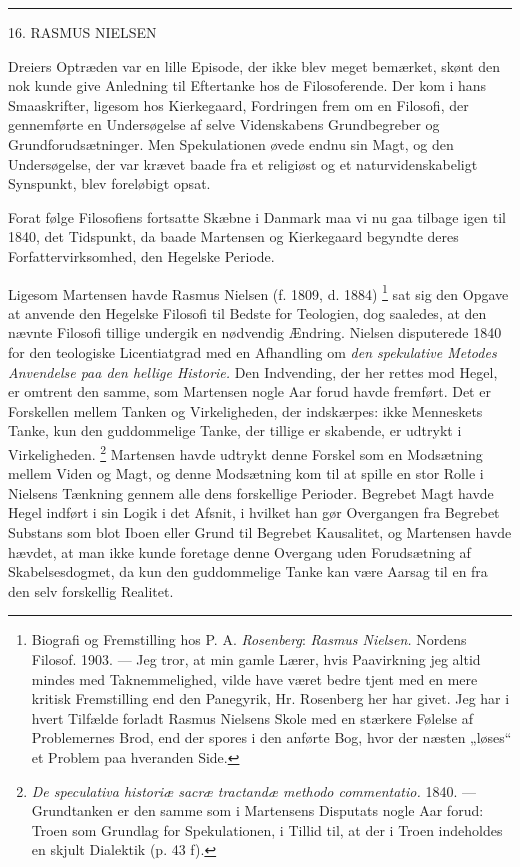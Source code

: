 \documentclass[12pt,a4paper,openany]{book}
\newcommand{\opage}[1]{\marginnote{\footnotesize\textit{[#1]}}}
\begin{document}
\begin{center}\rule{2cm}{0.4pt}\end{center}

\setcounter{footnote}{0}%
\opage{184}

\begin{center}\large 16. RASMUS NIELSEN\end{center}

Dreiers Optræden var en lille Episode, der ikke blev meget bemærket, skønt den
nok kunde give Anledning til Eftertanke hos de Filosoferende. Der kom i hans
Smaaskrifter, ligesom hos Kierkegaard, Fordringen frem om en Filosofi, der
gennemførte en Undersøgelse af selve Videnskabens Grundbegreber og
Grundforudsætninger. Men Spekulationen øvede endnu sin Magt, og den
Undersøgelse, der var krævet baade fra et religiøst og et naturvidenskabeligt
Synspunkt, blev foreløbigt opsat.

Forat følge Filosofiens fortsatte Skæbne i Danmark maa vi nu gaa tilbage igen
til 1840, det Tidspunkt, da baade Martensen og Kierkegaard begyndte deres
Forfattervirksomhed, den Hegelske Periode.

Ligesom Martensen havde Rasmus Nielsen (f. 1809, d. 1884)%
\footnote[1]{Biografi og Fremstilling hos P. A. \emph{Rosenberg}:
\textit{Rasmus Nielsen.} Nordens Filosof. 1903. --- Jeg tror, at min gamle
Lærer, hvis Paavirkning jeg altid mindes med Taknemmelighed, vilde have været
bedre tjent med en mere kritisk Fremstilling end den Panegyrik, Hr. Rosenberg
her har givet. Jeg har i hvert Tilfælde forladt Rasmus Nielsens Skole med en
stærkere Følelse af Problemernes Brod, end der spores i den anførte Bog, hvor
der næsten „løses“ et Problem paa hveranden Side.} sat sig den Opgave at
anvende den Hegelske Filosofi til Bedste for Teologien, dog saaledes, at den
nævnte Filosofi tillige undergik en nødvendig Ændring. Nielsen disputerede 1840
for den teologiske Licentiatgrad med en Afhandling om \textit{den spekulative
Metodes Anvendelse paa den hellige Historie.} Den Indvending, der her rettes
mod Hegel, er omtrent
\setcounter{footnote}{0}%
\opage{185}den samme, som Martensen nogle Aar forud havde fremført. Det er
Forskellen mellem Tanken og Virkeligheden, der indskærpes: ikke Menneskets
Tanke, kun den guddommelige Tanke, der tillige er skabende, er udtrykt i
Virkeligheden.%
\footnote[1]{\textit{De speculativa historiæ sacræ tractandæ methodo
commentatio.} 1840. --- Grundtanken er den samme som i Martensens Disputats
nogle Aar forud: Troen som Grundlag for Spekulationen, i Tillid til, at der i
Troen indeholdes en skjult Dialektik (p. 43 f).} Martensen havde udtrykt denne
Forskel som en Modsætning mellem Viden og Magt, og denne Modsætning kom til at
spille en stor Rolle i Nielsens Tænkning gennem alle dens forskellige Perioder.
Begrebet Magt havde Hegel indført i sin Logik i det Afsnit, i hvilket han gør
Overgangen fra Begrebet Substans som blot Iboen eller Grund til Begrebet
Kausalitet, og Martensen havde hævdet, at man ikke kunde foretage denne
Overgang uden Forudsætning af Skabelsesdogmet, da kun den guddommelige Tanke
kan være Aarsag til en fra den selv forskellig Realitet.
\end{document}
